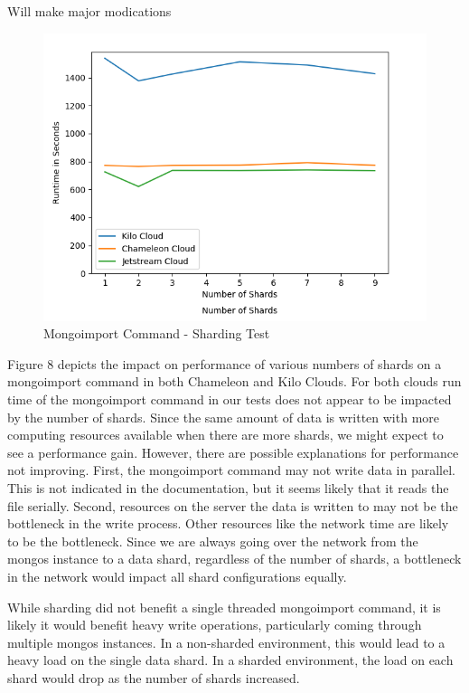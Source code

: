 \documentclass[9pt,twocolumn,twoside]{../../styles/osajnl}
\begin{document}
Will make major modications

\begin{figure}[!ht]
  \includegraphics[scale=0.45]{images/shard_import.png}
  \caption{Mongoimport Command - Sharding Test}
\end{figure}


Figure 8 depicts the impact on performance of various numbers of shards on a mongoimport command in both Chameleon and Kilo Clouds.  For both clouds run time of the mongoimport command in our tests does not appear to be  impacted by the number of shards.  Since the same amount of data is written with more computing resources available when there are more shards, we might expect to see a performance gain.  However, there are possible explanations for performance not improving.  First, the mongoimport command may not write data in parallel.  This is not indicated in the documentation, but it seems likely that it reads the file serially.  Second, resources on the server the data is written to may not be the bottleneck in the write process.  Other resources like the network time are likely to be the bottleneck.  Since we are always going over the network from the mongos instance to a data shard, regardless of the number of shards, a bottleneck in the network would impact all shard configurations equally.

While sharding did not benefit a single threaded mongoimport command, it is likely it would benefit heavy write operations, particularly coming through multiple mongos instances.  In a non-sharded environment, this would lead to a heavy load on the single data shard.  In a sharded environment, the load on each shard would drop as the number of shards increased.
\end{document}
